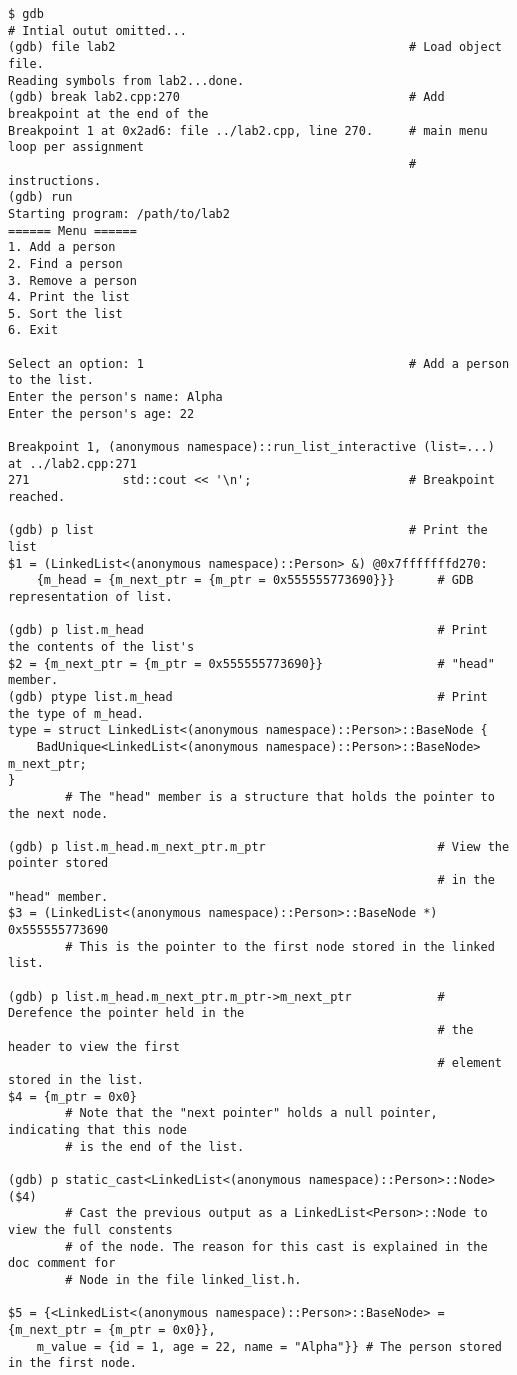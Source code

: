 \documentclass[11pt, letterpaper]{article} %
\begin{document}
\begin{lstlisting}[style=labreportstyle-sh]
$ gdb
# Intial outut omitted...
(gdb) file lab2                                         # Load object file.
Reading symbols from lab2...done.
(gdb) break lab2.cpp:270                                # Add breakpoint at the end of the
Breakpoint 1 at 0x2ad6: file ../lab2.cpp, line 270.     # main menu loop per assignment
                                                        # instructions.
(gdb) run
Starting program: /path/to/lab2
====== Menu ======
1. Add a person
2. Find a person
3. Remove a person
4. Print the list
5. Sort the list
6. Exit

Select an option: 1                                     # Add a person to the list.
Enter the person's name: Alpha
Enter the person's age: 22

Breakpoint 1, (anonymous namespace)::run_list_interactive (list=...) at ../lab2.cpp:271
271             std::cout << '\n';                      # Breakpoint reached.

(gdb) p list                                            # Print the list
$1 = (LinkedList<(anonymous namespace)::Person> &) @0x7fffffffd270: 
    {m_head = {m_next_ptr = {m_ptr = 0x555555773690}}}      # GDB representation of list.

(gdb) p list.m_head                                         # Print the contents of the list's
$2 = {m_next_ptr = {m_ptr = 0x555555773690}}                # "head" member.
(gdb) ptype list.m_head                                     # Print the type of m_head.
type = struct LinkedList<(anonymous namespace)::Person>::BaseNode {
    BadUnique<LinkedList<(anonymous namespace)::Person>::BaseNode> m_next_ptr;
}
        # The "head" member is a structure that holds the pointer to the next node.

(gdb) p list.m_head.m_next_ptr.m_ptr                        # View the pointer stored 
                                                            # in the "head" member.
$3 = (LinkedList<(anonymous namespace)::Person>::BaseNode *) 0x555555773690
        # This is the pointer to the first node stored in the linked list.

(gdb) p list.m_head.m_next_ptr.m_ptr->m_next_ptr            # Derefence the pointer held in the
                                                            # the header to view the first
                                                            # element stored in the list.
$4 = {m_ptr = 0x0}
        # Note that the "next pointer" holds a null pointer, indicating that this node
        # is the end of the list.

(gdb) p static_cast<LinkedList<(anonymous namespace)::Person>::Node>($4)
        # Cast the previous output as a LinkedList<Person>::Node to view the full constents
        # of the node. The reason for this cast is explained in the doc comment for 
        # Node in the file linked_list.h.

$5 = {<LinkedList<(anonymous namespace)::Person>::BaseNode> = {m_next_ptr = {m_ptr = 0x0}}, 
    m_value = {id = 1, age = 22, name = "Alpha"}} # The person stored in the first node.
\end{lstlisting}
\end{document}
